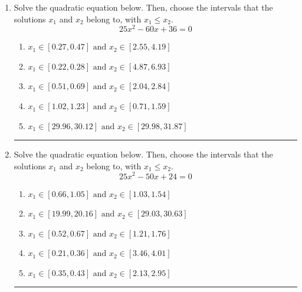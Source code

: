 \documentclass[14pt]{extbook}
\newcommand{\litem}[1]{\item#1\hspace*{-1cm}\rule{\textwidth}{0.4pt}}
\begin{document}
\begin{enumerate}
\litem{
Solve the quadratic equation below. Then, choose the intervals that the solutions $x_1$ and $x_2$ belong to, with $x_1 \leq x_2$.\[ 25x^{2} -60 x + 36 = 0 \]\begin{enumerate}[label=\Alph*.]
\item \( x_1 \in [0.27, 0.47] \text{ and } x_2 \in [2.55, 4.19] \)
\item \( x_1 \in [0.22, 0.28] \text{ and } x_2 \in [4.87, 6.93] \)
\item \( x_1 \in [0.51, 0.69] \text{ and } x_2 \in [2.04, 2.84] \)
\item \( x_1 \in [1.02, 1.23] \text{ and } x_2 \in [0.71, 1.59] \)
\item \( x_1 \in [29.96, 30.12] \text{ and } x_2 \in [29.98, 31.87] \)

\end{enumerate} }
\litem{
Solve the quadratic equation below. Then, choose the intervals that the solutions $x_1$ and $x_2$ belong to, with $x_1 \leq x_2$.\[ 25x^{2} -50 x + 24 = 0 \]\begin{enumerate}[label=\Alph*.]
\item \( x_1 \in [0.66, 1.05] \text{ and } x_2 \in [1.03, 1.54] \)
\item \( x_1 \in [19.99, 20.16] \text{ and } x_2 \in [29.03, 30.63] \)
\item \( x_1 \in [0.52, 0.67] \text{ and } x_2 \in [1.21, 1.76] \)
\item \( x_1 \in [0.21, 0.36] \text{ and } x_2 \in [3.46, 4.01] \)
\item \( x_1 \in [0.35, 0.43] \text{ and } x_2 \in [2.13, 2.95] \)


\end{enumerate}}
\end{enumerate}
\end{document}

